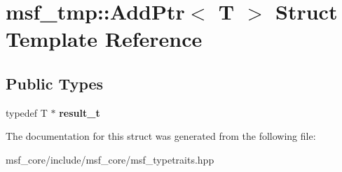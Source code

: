 \hypertarget{structmsf__tmp_1_1AddPtr}{\section{msf\-\_\-tmp\-:\-:Add\-Ptr$<$ T $>$ Struct Template Reference}
\label{structmsf__tmp_1_1AddPtr}
}
\subsection*{Public Types}
\begin{DoxyCompactItemize}
\item 
\hypertarget{structmsf__tmp_1_1AddPtr_a6c4251215d0036665b0f3f956a3d899b}{typedef T $\ast$ {\bfseries result\-\_\-t}}\label{structmsf__tmp_1_1AddPtr_a6c4251215d0036665b0f3f956a3d899b}

\end{DoxyCompactItemize}


The documentation for this struct was generated from the following file\-:\begin{DoxyCompactItemize}
\item 
msf\-\_\-core/include/msf\-\_\-core/msf\-\_\-typetraits.\-hpp\end{DoxyCompactItemize}

